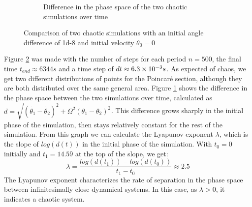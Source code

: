 \documentclass[a4paper,12pt,twoside]{article}
\begin{document}
\begin{figure}[h]
\begin{subfigure}[t]{0.45\textwidth}
		\caption{Difference in the phase space of the two chaotic simulations over time}
		\label{fig:e-lyap-chaos}
	\end{subfigure}
	\caption{Comparison of two chaotic simulations with an initial angle difference of \num{1d-8} and initial velocity $\theta_0 = 0$}
	\label{fig:e-chaos}
\end{figure}

Figure \ref{fig:e-chaos} was made with the number of steps for each period $n=500$, the final time $t_{end} \approx 6344 s$ and a time step of $dt \approx \num{6.3d-3} s$. As expected of chaos, we get two different distributions of points for the Poincaré section, although they are both distributed over the same general area. Figure \ref{fig:e-lyap-chaos} shows the difference in the phase space between the two simulations over time, calculated as $d=\sqrt{(\dot{\theta_1}-\dot{\theta_2})^2 + \Omega^2 (\theta_1-\theta_2)^2}$. This difference grows sharply in the initial phase of the simulation, then stays relatively constant for the rest of the simulation. From this graph we can calculate the Lyapunov exponent $\lambda$, which is the slope of $log(d(t))$ in the initial phase of the simulation. With $t_0 = 0$ initially and $t_1=14.59$ at the top of the slope, we get:
\begin{equation*}
\lambda = \frac{log(d(t_1))-log(d(t_0))}{t_1-t_0} \approx 2.5
\end{equation*}
The Lyapunov exponent characterizes the rate of separation in the phase space between infinitesimally close dynamical systems.\cite{Lyap} In this case, as $\lambda > 0$, it indicates a chaotic system.\cite{Lyap2}
\end{document}

